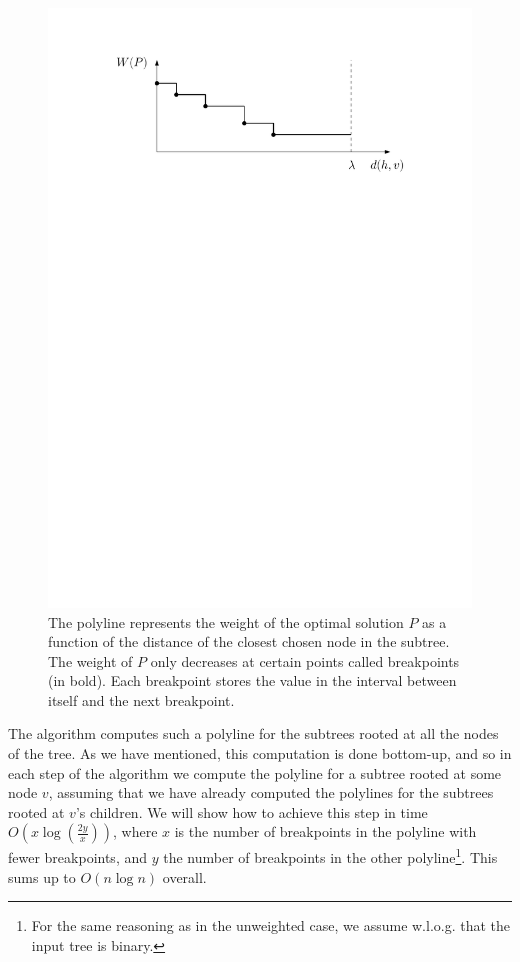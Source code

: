 \documentclass[a4paper,UKenglish]{lipics-v2016}
\theoremstyle{plain}
\begin{document}
\begin{figure}[h]
\begin{center}
\includegraphics[scale=0.55]{polyline}
\end{center}
\caption{The polyline represents the weight of the optimal solution $P$ as a function of the distance of the closest chosen node in the subtree. %
The weight of $P$ only decreases at certain points called breakpoints (in bold). Each breakpoint stores the value in the interval between itself and the next breakpoint.
\label{figure of a polyline}}
\end{figure}


The algorithm computes such a polyline for the subtrees rooted at all the nodes of the tree. As we have mentioned, this computation is done bottom-up, and so in each step of the algorithm we compute the polyline for a subtree rooted at some node $v$, assuming that we have already computed the polylines for the subtrees rooted at $v$'s children. We will show how to achieve this step in time $O(x \log (\frac{2y}{x}))$, where $x$ is the number of breakpoints in the polyline with fewer breakpoints, and $y$ the number of breakpoints in the other polyline\footnote{For the same reasoning as in the unweighted case, we assume w.l.o.g. that the input tree is binary.}. This sums up to $O(n \log n)$ overall.
\end{document}
